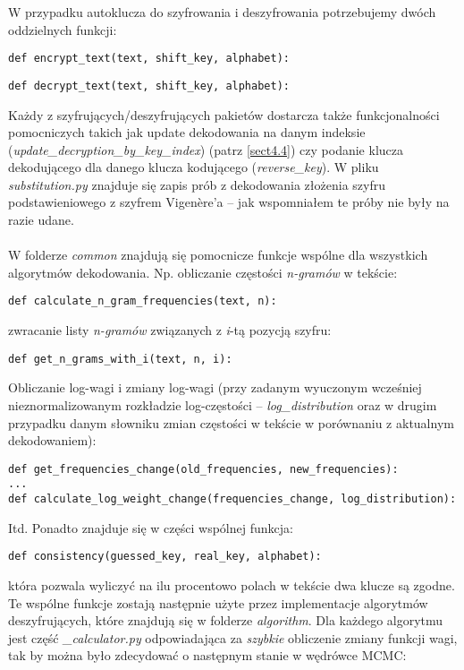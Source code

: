 \documentclass[a4paper]{article}
\theoremstyle{defn}
\theoremstyle{theorem}
\theoremstyle{lemma}
\theoremstyle{cor}
\theoremstyle{fact}
\begin{document}
W przypadku autoklucza do szyfrowania i deszyfrowania potrzebujemy dwóch oddzielnych funkcji:
\begin{lstlisting}
def encrypt_text(text, shift_key, alphabet):
\end{lstlisting}
\begin{lstlisting}
def decrypt_text(text, shift_key, alphabet):
\end{lstlisting}
Każdy z szyfrujących/deszyfrujących pakietów dostarcza także funkcjonalności pomocniczych takich jak update dekodowania na danym indeksie (\textit{update\_decryption\_by\_key\_index}) (patrz \ref{sect4.4}) czy podanie klucza dekodującego dla danego klucza kodującego (\textit{reverse\_key}). W pliku \textit{substitution.py} znajduje się zapis prób z dekodowania złożenia szyfru podstawieniowego z szyfrem Vigenère'a – jak wspomniałem te próby nie były na razie udane.\\\\
W folderze \textit{common} znajdują się pomocnicze funkcje wspólne dla wszystkich algorytmów dekodowania. Np. obliczanie częstości \textit{n-gramów} w tekście:
\begin{lstlisting}
def calculate_n_gram_frequencies(text, n):
\end{lstlisting}
zwracanie listy \textit{n-gramów} związanych z \textit{i}-tą pozycją szyfru:
\begin{lstlisting}
def get_n_grams_with_i(text, n, i):
\end{lstlisting}
Obliczanie log-wagi i zmiany log-wagi (przy zadanym wyuczonym wcześniej nieznormalizowanym rozkładzie log-częstości – \textit{log\_distribution} oraz w drugim przypadku danym słowniku zmian częstości w tekście w porównaniu z aktualnym dekodowaniem):
\begin{lstlisting}
def get_frequencies_change(old_frequencies, new_frequencies):
...
def calculate_log_weight_change(frequencies_change, log_distribution):
\end{lstlisting}
Itd. Ponadto znajduje się w części wspólnej funkcja:
\begin{lstlisting}
def consistency(guessed_key, real_key, alphabet):
\end{lstlisting}
która pozwala wyliczyć na ilu procentowo polach w tekście dwa klucze są zgodne.\\
Te wspólne funkcje zostają następnie użyte przez implementacje algorytmów deszyfrujących, które znajdują się w folderze \textit{algorithm}. Dla każdego algorytmu jest część \textit{\_calculator.py} odpowiadająca za \textit{szybkie} obliczenie zmiany funkcji wagi, tak by można było zdecydować o następnym stanie w wędrówce MCMC:
\end{document}
